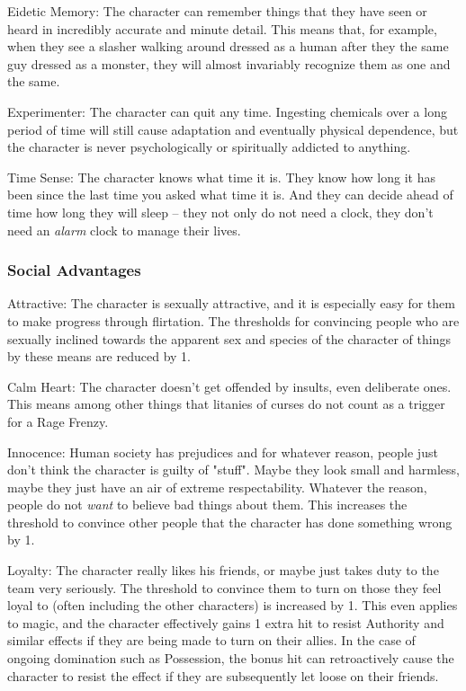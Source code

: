 \begin{description*}
\item[Eidetic Memory:] The character can remember things that they have seen or heard in incredibly accurate and minute detail. This means that, for example, when they see a slasher walking around dressed as a human after they the same guy dressed as a monster, they will almost invariably recognize them as one and the same.
\item[Experimenter:] The character can quit any time. Ingesting chemicals over a long period of time will still cause adaptation and eventually physical dependence, but the character is never psychologically or spiritually addicted to anything.
\item[Time Sense:] The character knows what time it is. They know how long it has been since the last time you asked what time it is. And they can decide ahead of time how long they will sleep -- they not only do not need a clock, they don't need an \textit{alarm} clock to manage their lives.
\end{description*}

\subsubsection{Social Advantages}

\begin{description*}
\item[Attractive:] The character is sexually attractive, and it is especially easy for them to make progress through flirtation. The thresholds for convincing people who are sexually inclined towards the apparent sex and species of the character of things by these means are reduced by 1.
\item[Calm Heart:] The character doesn't get offended by insults, even deliberate ones. This means among other things that litanies of curses do not count as a trigger for a Rage Frenzy.
\item[Innocence:] Human society has prejudices and for whatever reason, people just don't think the character is guilty of "stuff". Maybe they look small and harmless, maybe they just have an air of extreme respectability. Whatever the reason, people do not \textit{want} to believe bad things about them. This increases the threshold to convince other people that the character has done something wrong by 1.
\item[Loyalty:] The character really likes his friends, or maybe just takes duty to the team very seriously. The threshold to convince them to turn on those they feel loyal to (often including the other characters) is increased by 1. This even applies to magic, and the character effectively gains 1 extra hit to resist Authority and similar effects if they are being made to turn on their allies. In the case of ongoing domination such as Possession, the bonus hit can retroactively cause the character to resist the effect if they are subsequently let loose on their friends.
\end{description*}

